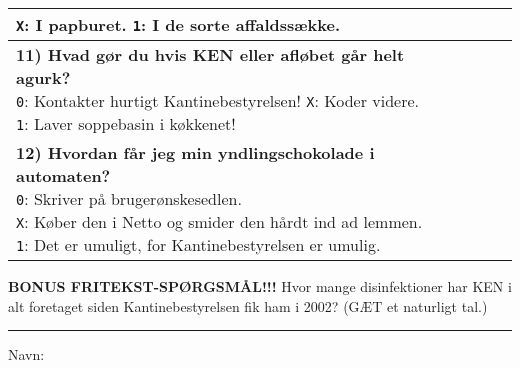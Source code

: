 \documentclass[a4paper]{article}
\begin{document}
\begin{center}
\begin{tabular}{|p{12cm}|p{0.2cm}|p{0.2cm}|p{0.2cm}|}
{  \texttt{X}: I papburet. \quad
  \texttt{1}: I de sorte affaldssække.
  \vspace{0.1cm}
} & & & \\\hline
\parbox{12cm}{
  \vspace{0.2cm}
  \textbf{11) Hvad gør du hvis KEN eller afløbet går helt agurk?} \\
  \texttt{0}: Kontakter hurtigt Kantinebestyrelsen! \quad
  \texttt{X}: Koder videre. \quad \\
  \texttt{1}: Laver soppebasin i køkkenet!
  \vspace{0.1cm}
} & & & \\\hline
\parbox{12cm}{
  \vspace{0.2cm}
  \textbf{12) Hvordan får jeg min yndlingschokolade i automaten?} \\
  \texttt{0}: Skriver på brugerønskesedlen. \\
  \texttt{X}: Køber den i Netto og smider den hårdt ind ad lemmen. \\
  \texttt{1}: Det er umuligt, for Kantinebestyrelsen er umulig.
  \vspace{0.1cm}
} & & & \\\hline
\end{tabular}

\vspace{0.5cm}

{\large\textbf{BONUS FRITEKST-SPØRGSMÅL!!!} Hvor mange disinfektioner har KEN i
alt foretaget siden Kantinebestyrelsen fik ham i 2002? (GÆT et naturligt tal.)
\\ \vspace{0.5cm} \rule{5cm}{0.4pt}}

\vspace{0.7cm}

{\large Navn: \hrulefill}

\end{center}
\end{document}
